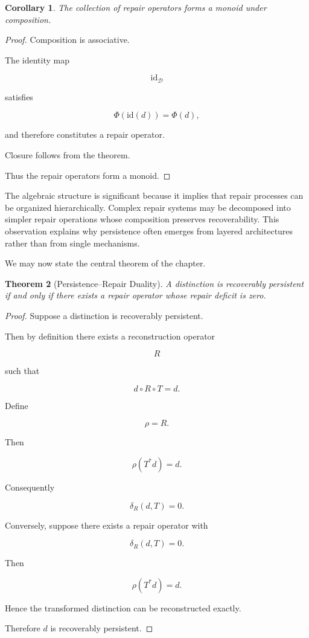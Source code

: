 \documentclass[12pt,oneside]{article}
\newtheorem{theorem}{Theorem}[section] \newtheorem{lemma}[theorem]{Lemma} \newtheorem{proposition}[theorem]{Proposition} \newtheorem{corollary}[theorem]{Corollary}
\theoremstyle{definition}
\begin{document}
\begin{corollary}

The collection of repair operators forms a monoid under composition.

\end{corollary}

\begin{proof}

Composition is associative.

The identity map

\[
\mathrm{id}_{\mathcal D}
\]

satisfies

\[
\Phi(\mathrm{id}(d))
=
\Phi(d),
\]

and therefore constitutes a repair operator.

Closure follows from the theorem.

Thus the repair operators form a monoid.

\end{proof}

The algebraic structure is significant because it implies that repair processes can be organized hierarchically. Complex repair systems may be decomposed into simpler repair operations whose composition preserves recoverability. This observation explains why persistence often emerges from layered architectures rather than from single mechanisms.

We may now state the central theorem of the chapter.

\begin{theorem}[Persistence–Repair Duality]

A distinction is recoverably persistent if and only if there exists a repair operator whose repair deficit is zero.

\end{theorem}

\begin{proof}

Suppose a distinction is recoverably persistent.

Then by definition there exists a reconstruction operator

\[
R
\]

such that

\[
d\circ R\circ T
=
d.
\]

Define

\[
\rho
=
R.
\]

Then

\[
\rho(T^*d)
=
d.
\]

Consequently

\[
\delta_R(d,T)=0.
\]

Conversely, suppose there exists a repair operator with

\[
\delta_R(d,T)=0.
\]

Then

\[
\rho(T^*d)=d.
\]

Hence the transformed distinction can be reconstructed exactly.

Therefore \(d\) is recoverably persistent.

\end{proof}
\end{document}
